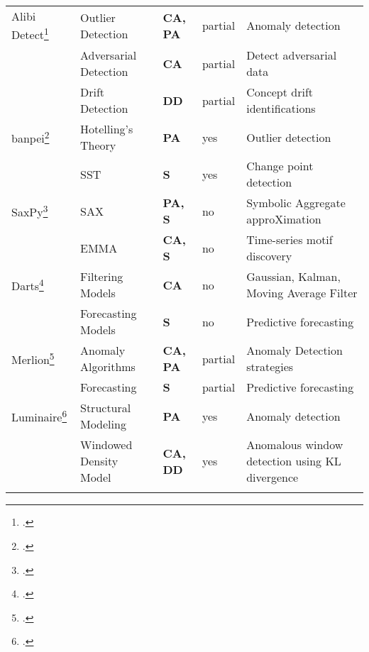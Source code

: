 \begin{longtable}{lP{3cm}llP{4cm}}
    Alibi Detect\footcite{alibi-detect} & Outlier Detection & \textbf{CA, PA} & partial & Anomaly detection\\
    & Adversarial Detection & \textbf{CA} & partial & Detect adversarial data \\
    & Drift Detection & \textbf{DD} & partial & Concept drift identifications \\
    \midrule 
    banpei\footcite{banpei} & Hotelling's Theory &  \textbf{PA} & yes & Outlier detection\\
    & SST & \textbf{S} & yes & Change point detection \\
    \midrule 
    SaxPy\footcite{senin2018grammarviz-saxpy} & SAX &  \textbf{PA, S} & no & Symbolic Aggregate approXimation \\
    & EMMA & \textbf{CA, S} & no & Time-series motif discovery\\
    \midrule 
    Darts\footcite{herzen2021darts} & Filtering Models & \textbf{CA} & no & Gaussian, Kalman, Moving Average Filter \\
    & Forecasting Models & \textbf{S} & no & Predictive forecasting \\
    \midrule 
    Merlion\footcite{bhatnagar2021merlion} & Anomaly Algorithms &  \textbf{CA, PA} & partial & Anomaly Detection strategies \\
    & Forecasting & \textbf{S} & partial & Predictive forecasting \\
    \midrule 
    Luminaire\footcite{chakraborty2020building-luminaire} & Structural Modeling &  \textbf{ PA } & yes & Anomaly detection \\
    & Windowed Density Model & \textbf{CA, DD} & yes & Anomalous window detection using KL divergence \\
    \label{tab:anom_detect_lib}
\end{longtable}

